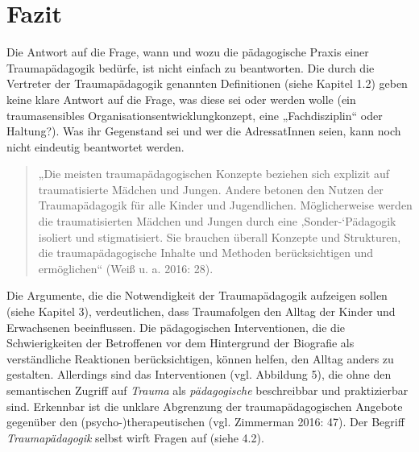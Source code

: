 \section{Fazit}
Die Antwort auf die Frage, wann und wozu die pädagogische Praxis einer Traumap{\"a}dagogik bedürfe, ist nicht einfach zu beantworten. Die durch die Vertreter der Traumap{\"a}dagogik genannten Definitionen (siehe Kapitel 1.2) geben keine klare Antwort auf die Frage, was diese sei oder werden wolle (ein traumasensibles Organisationsentwicklungkonzept, eine „Fachdisziplin“ oder Haltung?). Was ihr Gegenstand sei und wer die AdressatInnen seien, kann noch nicht eindeutig beantwortet werden.

\begin{quote}
\small{„Die meisten traumap{\"a}dagogischen Konzepte beziehen sich explizit auf traumatisierte M{\"a}dchen und Jungen. Andere betonen den Nutzen der Traumap{\"a}dagogik f{\"u}r alle Kinder und Jugendlichen. M{\"o}glicherweise werden die traumatisierten M{\"a}dchen und Jungen durch eine ‚Sonder-‘P{\"a}dagogik isoliert und stigmatisiert. Sie brauchen {\"u}berall Konzepte und Strukturen, die traumap{\"a}dagogische Inhalte und Methoden ber{\"u}cksichtigen und erm{\"o}glichen“ (Weiß u. a. 2016: 28).}
\end{quote}

Die Argumente, die die Notwendigkeit der Traumap{\"a}dagogik aufzeigen sollen (siehe Kapitel 3), verdeutlichen, dass Traumafolgen den Alltag der Kinder und Erwachsenen beeinflussen. Die pädagogischen Interventionen, die die Schwierigkeiten der Betroffenen vor dem Hintergrund der Biografie als verständliche Reaktionen berücksichtigen, können helfen, den Alltag anders zu gestalten. Allerdings sind das Interventionen (vgl. Abbildung 5), die ohne den semantischen Zugriff auf \textit{Trauma} als \textit{pädagogische} beschreibbar und praktizierbar sind. Erkennbar ist die unklare Abgrenzung der traumapädagogischen Angebote gegenüber den (psycho-)therapeutischen (vgl. Zimmerman 2016: 47). Der Begriff \textit{Traumapädagogik} selbst wirft Fragen auf (siehe 4.2).

